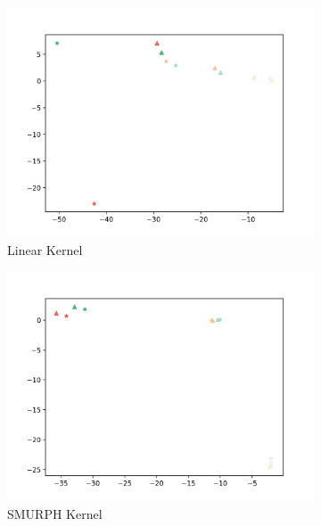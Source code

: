 \documentclass[10pt]{article}
\begin{document}
\begin{figure}[H]
    \centering
    \begin{subfigure}[h]{0.3\textwidth}
        \includegraphics[width=\linewidth]{ms_linear}
        \caption{Linear Kernel}
    \end{subfigure}
    \begin{subfigure}[h]{0.3\textwidth}
        \includegraphics[width=\linewidth]{ms_smurf}
        \caption{SMURPH Kernel}
    \end{subfigure}%
    \begin{subfigure}[h]{0.3\textwidth}

\end{subfigure}
\end{figure}
\end{document}
